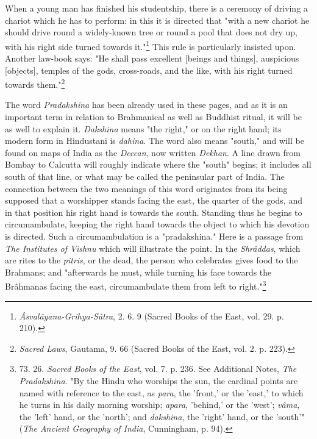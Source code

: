 \documentclass[a4paper, 11pt, oneside, polutonikogreek, english]{article}
\begin{document}
When a young man has finished his studentship, there is a ceremony of driving a chariot which he has to perform: in this it is directed that "with a new chariot he should drive round a widely-known tree or round a pool that does not dry up, with his right side turned towards it."\footnote{\emph{Âsvalâyana-Grihya-Sûtra}, 2. 6. 9 (Sacred Books of the East, vol. 29. p. 210).} This rule is particularly insisted upon. Another law-book says: "He shall pass excellent [beings and things], auspicious [objects], temples of the gods, cross-roads, and the like, with his right turned towards them."\footnote{\emph{Sacred Laws}, Gautama, 9. 66  (Sacred Books of the East, vol. 2. p. 223).}

The word \emph{Pradakshina} has been already used in these pages, and as it is an important term in relation to Brahmanical as well as Buddhist ritual, it will be as well to explain it. \emph{Dakshina} means "the right," or on the right hand; its modern form in Hindustani is \emph{dahina}. The word also means "south," and will be found on maps of India as the \emph{Deccan}, now written \emph{Dekhan}. A line drawn from Bombay to Calcutta will roughly indicate where the "south" begins; it includes all south of that line, or what may be called the peninsular part of India. The connection between the two meanings of this word originates from its being supposed that a worshipper stands facing the east, the quarter of the gods, and in that position his right hand is towards the south. Standing thus he begins to circumambulate, keeping the right hand towards the object to which his devotion is directed. Such a circumambulation is a "pradakshina." Here is a passage from \emph{The Institutes of Vishnu} which will illustrate the point. In the \emph{Shrâddas}, which are rites to the \emph{pitris}, or the dead, the person who celebrates gives food to the Brahmans; and "afterwards he must, while turning his face towards the Brâhmanas facing the east, circumambulate them from left to right."\footnote{73. 26. \emph{Sacred Books of the East}, vol. 7. p. 236. See Additional Notes, \emph{The Pradakshina}. "By the Hindu who worships the sun, the cardinal points are named with reference to the east, as \emph{para}, the 'front,' or the 'east,' to which he turns in his daily morning worship; \emph{apara}, 'behind,' or the 'west'; \emph{vâma}, the 'left' hand, or the 'north'; and \emph{dakshina}, the 'right' hand, or the 'south'" (\emph{The Ancient Geography of India}, Cunningham, p. 94).}
\end{document}
